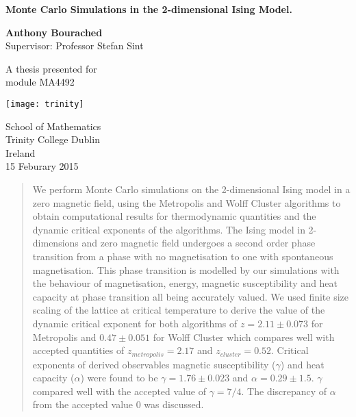 \documentclass[12pt] {report} %
\begin{document}
\tableofcontents

	
	\begin{titlepage}
	    \begin{center}
	        \vspace*{1cm}
	        
	        \Huge
	        \textbf{Monte Carlo Simulations in the 2-dimensional Ising Model.}
	        
	        \vspace{2cm}
	        
	        \textbf{Anthony Bourached}\\
	        Supervisor: Professor Stefan Sint
	        
	        \vfill
	        
	        A thesis presented for\\
	        module MA4492
	        
	        \vspace{0.8cm}
	        
	        \texttt{[image: trinity]}
	        
			\large 
	        School of Mathematics\\
	        Trinity College Dublin\\
	        Ireland\\
	        15 Feburary 2015
	        
	    \end{center}
	\end{titlepage}

	\begin{abstract}
		We perform Monte Carlo simulations on the 2-dimensional Ising model in a zero magnetic field, using the Metropolis and Wolff Cluster algorithms to obtain computational results for thermodynamic quantities and the dynamic critical exponents of the algorithms. The Ising model in 2-dimensions and zero magnetic field undergoes a second order phase transition from a phase with no magnetisation to one with spontaneous magnetisation. This phase transition is modelled by our simulations with the behaviour of magnetisation, energy, magnetic susceptibility and heat capacity at phase transition all being accurately valued. We used finite size scaling of the lattice at critical temperature to derive the value of the dynamic critical exponent for both algorithms of $z = 2.11 \pm 0.073$ for Metropolis and $0.47 \pm 0.051$ for Wolff Cluster which compares well with accepted quantities of $z_{metropolis} = 2.17$ and $z_{cluster} = 0.52$. Critical exponents of derived observables magnetic susceptibility ($\gamma$) and heat capacity ($\alpha$) were found to be $\gamma = 1.76 \pm 0.023$ and $\alpha = 0.29 \pm 1.5$. $\gamma$ compared well with the accepted value of $\gamma = 7/4$. The discrepancy of $\alpha$ from the accepted value 0 was discussed.
	\end{abstract}
	
\end{document}

